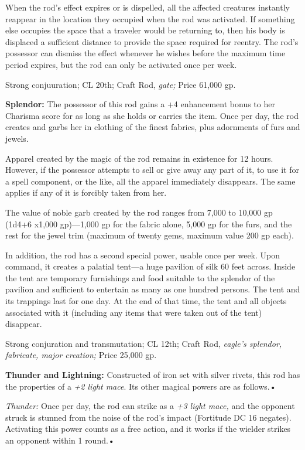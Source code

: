 When the rod's effect expires or is dispelled, all the affected creatures instantly 
reappear in the location they occupied when the rod was activated. If something 
else occupies the space that a traveler would be returning to, then his body is 
displaced a sufficient distance to provide the space required for reentry. The 
rod's possessor can dismiss the effect whenever he wishes before the maximum time 
period expires, but the rod can only be activated once per week.

Strong conjuuration; CL 20th; Craft Rod, \textit{gate; }Price 61,000 gp.

\textbf{Splendor: }The possessor of this rod gains a +4 enhancement bonus to her 
Charisma score for as long as she holds or carries the item. Once per day, the 
rod creates and garbs her in clothing of the finest fabrics, plus adornments of 
furs and jewels. 

Apparel created by the magic of the rod remains in existence for 12 hours. However, 
if the possessor attempts to sell or give away any part of it, to use it for a 
spell component, or the like, all the apparel immediately disappears. The same 
applies if any of it is forcibly taken from her.

The value of noble garb created by the rod ranges from 7,000 to 10,000 gp (1d4+6 
x$ $1,000 gp)---1,000 gp for the fabric alone, 5,000 gp for the furs, and the rest 
for the jewel trim (maximum of twenty gems, maximum value 200 gp each).

In addition, the rod has a second special power, usable once per week. Upon command, 
it creates a palatial tent---a huge pavilion of silk 60 feet across. Inside the 
tent are temporary furnishings and food suitable to the splendor of the pavilion 
and sufficient to entertain as many as one hundred persons. The tent and its trappings 
last for one day. At the end of that time, the tent and all objects associated 
with it (including any items that were taken out of the tent) disappear.

Strong conjuration and transmutation; CL 12th; Craft Rod, \textit{eagle's splendor, 
fabricate, major creation; }Price 25,000 gp.

\textbf{Thunder and Lightning: }Constructed of iron set with silver rivets, this 
rod has the properties of a \textit{+2 light mace}. Its other magical powers are 
as follows.•

\textit{Thunder: }Once per day, the rod can strike as a \textit{+3 light mace, 
}and the opponent struck is stunned from the noise of the rod's impact (Fortitude 
DC 16 negates). Activating this power counts as a free action, and it works if 
the wielder strikes an opponent within 1 round.•

